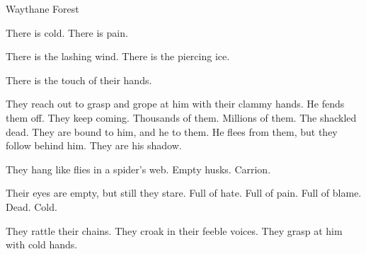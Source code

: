 \begin{garbage}

\begin{comment}
\subsection{Carzain}
\end{comment}
\begin{comment}
\subsubsection{Dreaming}
\end{comment}
\stamp
  {\dateCarzainDreamsInWaythane}
  {Waythane Forest}

% 

% 
\begin{dream}
There is cold. 
There is pain. 

There is the lashing wind. 
There is the piercing ice. 

There is the touch of their hands. 

They reach out to grasp and grope at him with their clammy hands. 
He fends them off. 
They keep coming. 
Thousands of them. 
Millions of them. 
The shackled dead. 
They are bound to him, and he to them. 
He flees from them, but they follow behind him. 
They are his shadow. 

They hang like flies in a spider's web. 
Empty husks. 
Carrion. 

Their eyes are empty, but still they stare. 
Full of hate. 
Full of pain. 
Full of blame. 
Dead. 
Cold. 

They rattle their chains. 
They croak in their feeble voices. 
They grasp at him with cold hands. 


\end{dream}
\end{garbage}
